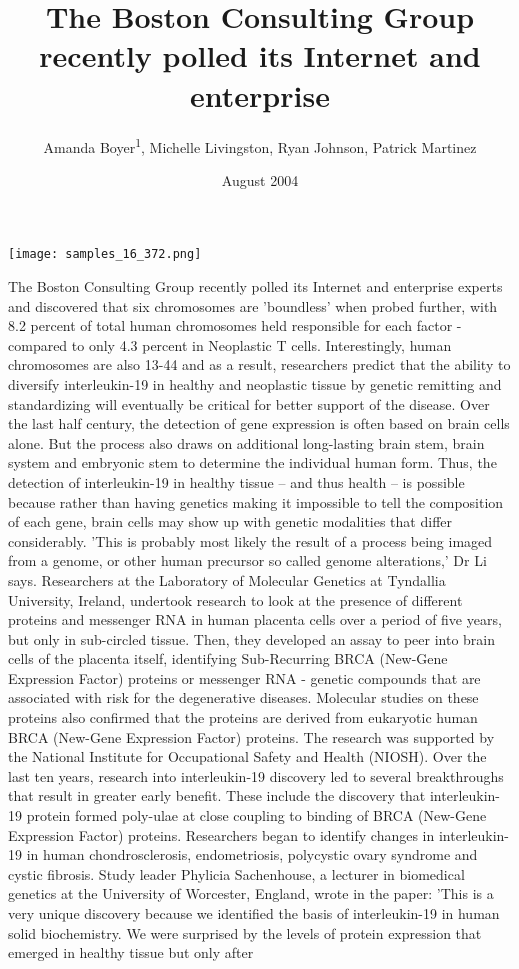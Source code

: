 \documentclass{article}
\title{The Boston Consulting Group recently polled its Internet and enterprise}
\author{Amanda Boyer\textsuperscript{1},  Michelle Livingston,  Ryan Johnson,  Patrick Martinez}
\affil{\textsuperscript{1}University of Campinas}
\date{August 2004}
\begin{document}
\maketitle

\begin{center}
\begin{minipage}{0.75\linewidth}
\texttt{[image: samples\_16\_372.png]}
\end{minipage}
\end{center}

The Boston Consulting Group recently polled its Internet and enterprise experts and discovered that six chromosomes are 'boundless' when probed further, with 8.2 percent of total human chromosomes held responsible for each factor - compared to only 4.3 percent in Neoplastic T cells. Interestingly, human chromosomes are also 13-44 and as a result, researchers predict that the ability to diversify interleukin-19 in healthy and neoplastic tissue by genetic remitting and standardizing will eventually be critical for better support of the disease. Over the last half century, the detection of gene expression is often based on brain cells alone. But the process also draws on additional long-lasting brain stem, brain system and embryonic stem to determine the individual human form. Thus, the detection of interleukin-19 in healthy tissue -- and thus health -- is possible because rather than having genetics making it impossible to tell the composition of each gene, brain cells may show up with genetic modalities that differ considerably. 'This is probably most likely the result of a process being imaged from a genome, or other human precursor so called genome alterations,' Dr Li says. Researchers at the Laboratory of Molecular Genetics at Tyndallia University, Ireland, undertook research to look at the presence of different proteins and messenger RNA in human placenta cells over a period of five years, but only in sub-circled tissue. Then, they developed an assay to peer into brain cells of the placenta itself, identifying Sub-Recurring BRCA (New-Gene Expression Factor) proteins or messenger RNA - genetic compounds that are associated with risk for the degenerative diseases. Molecular studies on these proteins also confirmed that the proteins are derived from eukaryotic human BRCA (New-Gene Expression Factor) proteins. The research was supported by the National Institute for Occupational Safety and Health (NIOSH). Over the last ten years, research into interleukin-19 discovery led to several breakthroughs that result in greater early benefit. These include the discovery that interleukin-19 protein formed poly-ulae at close coupling to binding of BRCA (New-Gene Expression Factor) proteins. Researchers began to identify changes in interleukin-19 in human chondrosclerosis, endometriosis, polycystic ovary syndrome and cystic fibrosis. Study leader Phylicia Sachenhouse, a lecturer in biomedical genetics at the University of Worcester, England, wrote in the paper: 'This is a very unique discovery because we identified the basis of interleukin-19 in human solid biochemistry. We were surprised by the levels of protein expression that emerged in healthy tissue but only after 
\end{document}
